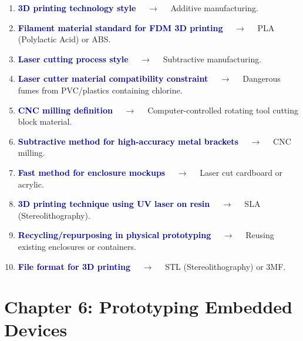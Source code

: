 \documentclass[11pt,a4paper]{article}
\begin{document}
\begin{enumerate}[label=\arabic*., leftmargin=*, labelsep=0.8em, itemsep=0.35em, parsep=0.1em, topsep=0.2em]
  \item \textcolor{darkblue}{\textbf{3D printing technology style}} $\quad\to\quad$ Additive manufacturing.
  \item \textcolor{darkblue}{\textbf{Filament material standard for FDM 3D printing}} $\quad\to\quad$ PLA (Polylactic Acid) or ABS.
  \item \textcolor{darkblue}{\textbf{Laser cutting process style}} $\quad\to\quad$ Subtractive manufacturing.
  \item \textcolor{darkblue}{\textbf{Laser cutter material compatibility constraint}} $\quad\to\quad$ Dangerous fumes from PVC/plastics containing chlorine.
  \item \textcolor{darkblue}{\textbf{CNC milling definition}} $\quad\to\quad$ Computer-controlled rotating tool cutting block material.
  \item \textcolor{darkblue}{\textbf{Subtractive method for high-accuracy metal brackets}} $\quad\to\quad$ CNC milling.
  \item \textcolor{darkblue}{\textbf{Fast method for enclosure mockups}} $\quad\to\quad$ Laser cut cardboard or acrylic.
  \item \textcolor{darkblue}{\textbf{3D printing technique using UV laser on resin}} $\quad\to\quad$ SLA (Stereolithography).
  \item \textcolor{darkblue}{\textbf{Recycling/repurposing in physical prototyping}} $\quad\to\quad$ Reusing existing enclosures or containers.
  \item \textcolor{darkblue}{\textbf{File format for 3D printing}} $\quad\to\quad$ STL (Stereolithography) or 3MF.
\end{enumerate}

\section*{Chapter 6: Prototyping Embedded Devices}
\end{document}

